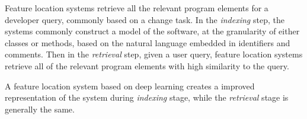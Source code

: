 
%      
%

Feature location systems retrieve all the relevant program elements
for a developer query, commonly based on a change task. In the {\em
  indexing} step, the systems commonly construct a model of the
software, at the granularity of either classes or methods, based on
the natural language embedded in identifiers and comments. Then in the
{\em retrieval} step, given a user query, feature location systems
retrieve all of the relevant program elements with high similarity to
the query.

A feature location system based on deep learning creates a improved
representation of the system during {\em indexing} stage, while
the {\em retrieval} stage is generally the same.




%


%







